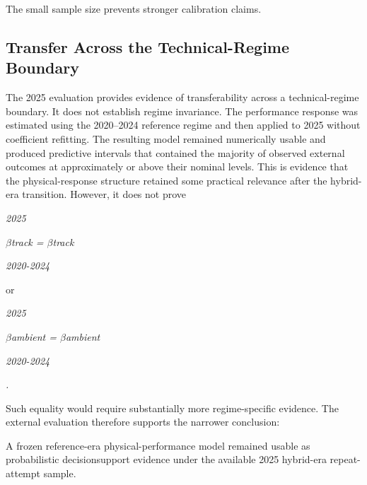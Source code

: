 The small sample size prevents stronger calibration claims.

\subsection{Transfer Across the Technical-Regime Boundary}
The 2025 evaluation provides evidence of transferability across a technical-regime boundary. It does not establish regime invariance. The performance response was estimated using the 2020--2024 reference regime and then applied to 2025 without coefficient refitting. The resulting model remained numerically usable and produced predictive intervals that contained the majority of observed external outcomes at approximately or above their nominal levels. This is evidence that the physical-response structure retained some practical relevance after the hybrid-era transition. However, it does not prove

\begin{center}\textit{2025}\end{center}

\begin{center}\textit{\ensuremath{\beta}track = \ensuremath{\beta}track}\end{center}

\begin{center}\textit{2020-2024}\end{center}

or

\begin{center}\textit{2025}\end{center}

\begin{center}\textit{\ensuremath{\beta}ambient = \ensuremath{\beta}ambient}\end{center}

\begin{center}\textit{2020-2024}\end{center}

\begin{center}\textit{.}\end{center}

Such equality would require substantially more regime-specific evidence. The external evaluation therefore supports the narrower conclusion:

A frozen reference-era physical-performance model remained usable as probabilistic decisionsupport evidence under the available 2025 hybrid-era repeat-attempt sample.

